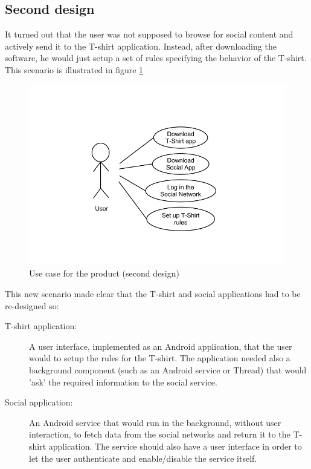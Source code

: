 \subsection{Second design}
It turned out that the user was not supposed to browse for social content and actively send it 
to the T-shirt application. Instead, after downloading the software, he would just setup a set of rules
specifying the behavior of the T-shirt. This scenario is illustrated in figure \ref{fig:design-usecase2}

\begin{figure}[h!]
	\centering \includegraphics[scale=0.35]{img/design-usecase2}
	\caption{Use case for the product (second design)}
	\label{fig:design-usecase2}
\end{figure}

This new scenario made clear that the T-shirt and social applications had to be re-designed so:

\begin{description}

	\item [T-shirt application:] A user interface, implemented as an Android application,
	that the user would to setup the rules for the T-shirt. The application needed also a
	background component (such as an Android service or Thread) that would 'ask' the required information
	to the social service.

	\item [Social application:] An Android service that would run in the background, without user interaction,
	to fetch data from the social networks and return it to the T-shirt application.
	The service should also have a user interface in order to let the user authenticate and
	enable/disable the service itself.

\end{description}

